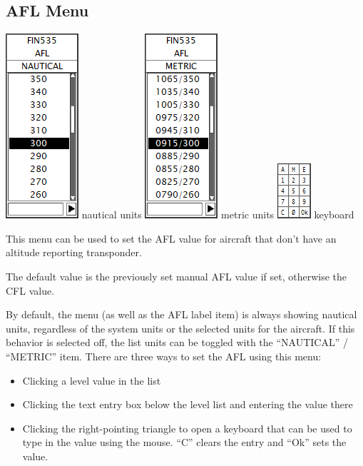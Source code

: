 \documentclass[11pt,a4paper]{memoir}
\begin{document}
\subsection{AFL Menu}
\label{menu:afl}
\includegraphics{img/afl.png}
nautical units
\includegraphics{img/aflm.png}
metric units
\includegraphics{img/kbd.png}
keyboard

This menu can be used to set the AFL value for aircraft that don’t have an altitude reporting transponder.

The default value is the previously set manual AFL value if set, otherwise the CFL value.

By default, the menu (as well as the AFL label item) is always showing nautical units, regardless of the system units or the selected units for the aircraft. If this behavior is selected off, the list units can be toggled with the “NAUTICAL” / “METRIC” item. There are three ways to set the AFL using this menu:

\begin{itemize}
        \item Clicking a level value in the list
        \item Clicking the text entry box below the level list and entering the value there
        \item Clicking the right-pointing triangle to open a keyboard that can be used to type in the value using the mouse. “C” clears the entry and “Ok” sets the value.
\end{itemize}
\end{document}
